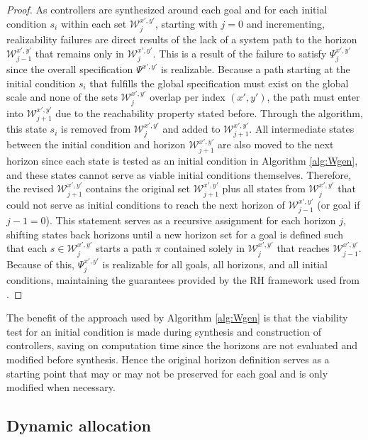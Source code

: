 \documentclass{ieeeaccess}
\begin{document}
\begin{proof}
	As controllers are synthesized around each goal and for each initial condition $s_i$ within each set $\mathcal{W}^{x',y'}_j$, starting with $j = 0$ and incrementing, realizability failures are direct results of the lack of a system path to the horizon $\mathcal{W}^{x',y'}_{j-1}$ that remains only in $\mathcal{W}^{x',y'}_{j}$. This is a result of the failure to satisfy $\Psi_{j}^{x',y'}$ since the overall specification $\Psi^{x',y'}$ is realizable. Because a path starting at the initial condition $s_i$ that fulfills the global specification must exist on the global scale and none of the sets $\mathcal{W}^{x',y'}_j$ overlap per index $(x',y')$, the path must enter into $\mathcal{W}^{x',y'}_{j+1}$ due to the reachability property stated before. Through the algorithm, this state $s_i$ is removed from $\mathcal{W}^{x',y'}_{j}$ and added to $\mathcal{W}^{x',y'}_{j+1}$. All intermediate states between the initial condition and horizon $\mathcal{W}^{x',y'}_{j+1}$ are also moved to the next horizon since each state is tested as an initial condition in Algorithm \ref{alg:Wgen}, and these states cannot serve as viable initial conditions themselves. Therefore, the revised $\mathcal{W}^{x',y'}_{j+1}$ contains the original set $\mathcal{W}^{x',y'}_{j+1}$ plus all states from $\mathcal{W}^{x',y'}_{j}$ that could not serve as initial conditions to reach the next horizon of $\mathcal{W}^{x',y'}_{j-1}$ (or goal if $j-1 = 0$). This statement serves as a recursive assignment for each horizon $j$, shifting states back horizons until a new horizon set for a goal is defined such that each $s \in \mathcal{W}^{x',y'}_{j}$ starts a path $\pi$ contained solely in $\mathcal{W}^{x',y'}_{j}$ that reaches $\mathcal{W}^{x',y'}_{j-1}$. Because of this, $\Psi_{j}^{x',y'}$ is realizable for all goals, all horizons, and all initial conditions, maintaining the guarantees provided by the RH framework used from \cite{c10}.
\end{proof}

The benefit of the approach used by Algorithm \ref{alg:Wgen} is that the viability test for an initial condition is made during synthesis and construction of controllers, saving on computation time since the horizons are not evaluated and modified before synthesis. Hence the original horizon definition serves as a starting point that may or may not be preserved for each goal and is only modified when necessary.

\subsection{Dynamic allocation}
\end{document}
